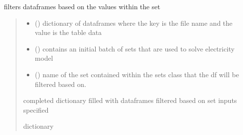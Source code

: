 \documentclass[letterpaper,10pt,english]{sphinxmanual}
\begin{document}
\begin{fulllineitems}
\label{\detokenize{src.models.electricity.scripts.preprocessor:src.models.electricity.scripts.preprocessor.subset_dfs}}
\pysigstartsignatures
\pysiglinewithargsret
{}
{\sphinxparamcomma {}\sphinxparamcomma {}}
{}
\pysigstopsignatures
\sphinxAtStartPar
filters dataframes based on the values within the set
\begin{quote}\begin{description}
\begin{itemize}
\item {} 
\sphinxAtStartPar
{} () \textendash{} dictionary of dataframes where the key is the file name and the value is the table data

\item {} 
\sphinxAtStartPar
{} ({\hyperref[\detokenize{src.models.electricity.scripts.preprocessor:src.models.electricity.scripts.preprocessor.Sets}]{}}) \textendash{} contains an initial batch of sets that are used to solve electricity model

\item {} 
\sphinxAtStartPar
{} () \textendash{} name of the set contained within the sets class that the df will be filtered based on.

\end{itemize}

\sphinxAtStartPar
completed dictionary filled with dataframes filtered based on set inputs specified

\sphinxAtStartPar
dictionary

\end{description}\end{quote}

\end{fulllineitems}

\end{document}
